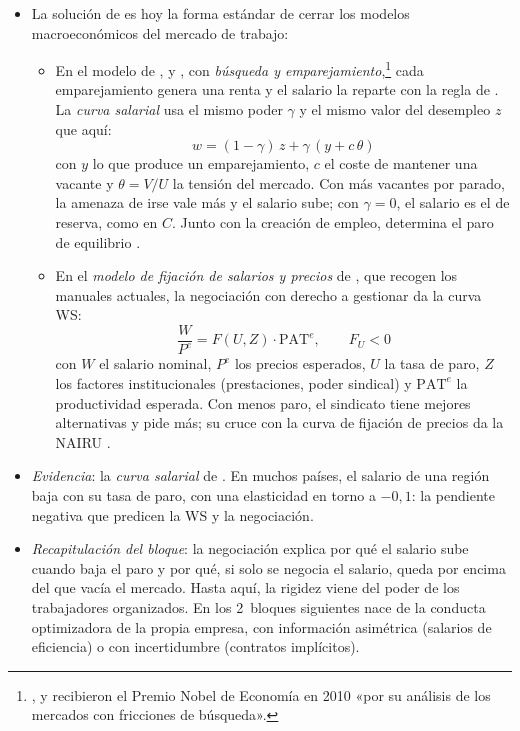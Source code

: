 \documentclass[11pt]{article}
\begin{document}
\begin{itemize}
\item La solución de  es hoy la forma estándar de cerrar los modelos macroeconómicos del mercado de trabajo:
  \begin{itemize}
  \item En el modelo de ,  y , con \emph{búsqueda y emparejamiento},\footnote{,  y  recibieron el Premio Nobel de Economía en 2010 «por su análisis de los mercados con fricciones de búsqueda»\nocite{Nobel2010DiamondMortensenPissarides}.} cada emparejamiento genera una renta y el salario la reparte con la regla de . La \emph{curva salarial} usa el mismo poder $\gamma$ y el mismo valor del desempleo $z$ que aquí:
    \begin{equation}
    w=(1-\gamma)\,z+\gamma\,(y+c\,\theta) \label{eq:curva-salarial-dmp}
    \end{equation}
    con $y$ lo que produce un emparejamiento, $c$ el coste de mantener una vacante y $\theta=V/U$ la tensión del mercado. Con más vacantes por parado, la amenaza de irse vale más y el salario sube; con $\gamma=0$, el salario es el de reserva, como en $C$. Junto con la creación de empleo, determina el paro de equilibrio .
  \item En el \emph{modelo de fijación de salarios y precios} de \textcite{LayardNickellJackman1991Unemployment}, que recogen los manuales actuales\nocite{CarlinSoskice2015Macroeconomics}, la negociación con derecho a gestionar da la curva WS:
    \begin{equation}
    \frac{W}{P^e}=F(U,Z)\cdot\mathrm{PAT}^e,\qquad F_U<0 \label{eq:ws}
    \end{equation}
    con $W$ el salario nominal, $P^e$ los precios esperados, $U$ la tasa de paro, $Z$ los factores institucionales (prestaciones, poder sindical) y $\mathrm{PAT}^e$ la productividad esperada. Con menos paro, el sindicato tiene mejores alternativas y pide más; su cruce con la curva de fijación de precios da la NAIRU .
  \end{itemize}
\item \emph{Evidencia}: la \emph{curva salarial} de \textcite{BlanchflowerOswald1994Wage}. En muchos países, el salario de una región baja con su tasa de paro, con una elasticidad en torno a $-0{,}1$: la pendiente negativa que predicen la WS y la negociación.
\item \emph{Recapitulación del bloque}: la negociación explica por qué el salario sube cuando baja el paro y por qué, si solo se negocia el salario, queda por encima del que vacía el mercado. Hasta aquí, la rigidez viene del poder de los trabajadores organizados. En los 2~bloques siguientes nace de la conducta optimizadora de la propia empresa, con información asimétrica (salarios de eficiencia) o con incertidumbre (contratos implícitos).
\end{itemize}
\end{document}
